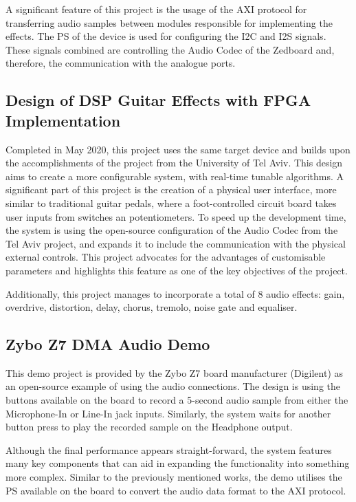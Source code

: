 A significant feature of this project is the usage of the AXI protocol\cite{axi} for transferring audio samples between modules responsible for implementing the effects. The PS of the device is used for configuring the I2C\cite{i2c} and I2S\cite{i2s} signals. These signals combined are controlling the Audio Codec of the Zedboard and, therefore, the communication with the analogue ports.

\subsection[]{Design of DSP Guitar Effects with FPGA Implementation\cite{rochester}}
Completed in May 2020, this project uses the same target device and builds upon the accomplishments of the project from the University of Tel Aviv. This design aims to create a more configurable system, with real-time tunable algorithms. A significant part of this project is the creation of a physical user interface, more similar to traditional guitar pedals, where a foot-controlled circuit board takes user inputs from switches an potentiometers. To speed up the development time, the system is using the open-source configuration of the Audio Codec from the Tel Aviv project, and expands it to include the communication with the physical external controls. This project advocates for the advantages of customisable parameters and highlights this feature as one of the key objectives of the project.

Additionally, this project manages to incorporate a total of 8 audio effects: gain, overdrive, distortion, delay, chorus, tremolo, noise gate and equaliser.


\subsection[]{Zybo Z7 DMA Audio Demo\cite{dma-demo}}
This demo project is provided by the Zybo Z7 board manufacturer (Digilent) as an open-source example of using the audio connections. The design is using the buttons available on the board to record a 5-second audio sample from either the Microphone-In or Line-In jack inputs. Similarly, the system waits for another button press to play the recorded sample on the Headphone output.

Although the final performance appears straight-forward, the system features many key components that can aid in expanding the functionality into something more complex. Similar to the previously mentioned works, the demo utilises the PS available on the board to convert the audio data format to the AXI protocol.

